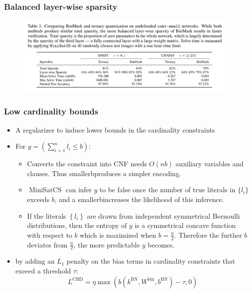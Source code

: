 \documentclass[aspectratio=169%
,serif,mathserif]{beamer}
\begin{document}
\begin{frame}
	\frametitle{Balanced layer-wise sparsity}
	\begin{figure}
		\includegraphics[width=0.9\linewidth]{4.png}
	\end{figure}
\end{frame}
 
\begin{frame}
	\frametitle{Low cardinality bounds}
	\begin{itemize}
		\item A regularizer to induce lower bounds in the cardinality constraints
		\item For $y=\left(\sum_{i=1}^{n} l_{i} \leq b\right)$:
			\begin{itemize}
				\item Converts the constraint into CNF needs $O(nb)$ auxiliary variables and clauses. Thus smallerbproduces a simpler encoding.
				\item $\operatorname{MiniSatCS}$ can infer $y$ to be false once the number of true literals in $\{l_i\}$exceeds $b$, and a smallerbincreases the likelihood of this inference.
				\item If the literals $\left\{l_{i}\right\}$ are drawn from independent symmetrical Bernoulli distributions, then the entropy of $y$ is a symmetrical concave function with respect to $b$ which is maximized when $b=\frac{n}{2}$. Therefore the further $b$ deviates from $\frac{n}{2}$, the more predictable $y$ becomes.
			\end{itemize}
		\item by adding an $L_1$ penalty on the bias terms in cardinality constraints that exceed a threshold $\tau$:
			\begin{equation*}
				L^{\mathrm{CBD}}=\eta \max \left(b\left(k^{\mathrm{BN}}, W^{\mathrm{bin}}, b^{\mathrm{BN}}\right)-\tau, 0\right)
			\end{equation*}			
			
	\end{itemize}
\end{frame}
\end{document}
